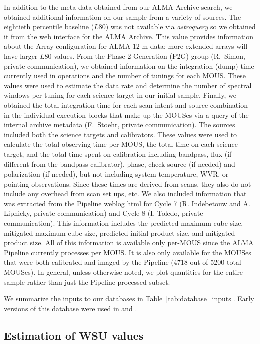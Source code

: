 \documentclass[preprint]{aastex631}
\begin{document}
In addition to the meta-data obtained from our ALMA Archive search, we obtained additional information on our sample from a variety of sources. The eightieth percentile baseline ($L80$) was not available via {\it astroquery} so we obtained it from the web interface for the ALMA Archive. This value provides information about the Array configuration for ALMA 12-m data: more extended arrays will have larger $L80$ values. From the Phase 2 Generation (P2G) group (R.\ Simon, private communication), we obtained information on the integration (dump) time currently used in operations and the number of tunings for each MOUS. These values were used to estimate the data rate and determine the number of spectral windows per tuning for each science target in our initial sample. Finally, we obtained the total integration time for each scan intent and source combination in the individual execution blocks that make up the MOUSes via a query of the internal archive metadata (F.\ Stoehr, private communication). The sources included both the science targets and calibrators. These values were used to calculate the total observing time per MOUS, the total time on each science target, and the total time spent on calibration including bandpass, flux (if different from the bandpass calibrator), phase,  check source (if needed) and polarization (if needed), but not including system temperature, WVR, or pointing observations. Since these times are derived from scans, they also do not include any overhead from scan set ups, etc. We also included information that was extracted from the Pipeline weblog html for Cycle 7 (R. Indebetouw and A. Lipnicky, private communication) and Cycle 8 (I. Toledo, private communication). This information includes the predicted maximum cube size, mitigated maximum cube size, predicted initial product size, and mitigated product size. All of this information is available only per-MOUS since the ALMA Pipeline currently processes per MOUS. It is also only available for the MOUSes that were both calibrated and imaged by the Pipeline (4718 out of 5200 total MOUSes). In general, unless otherwise noted, we plot quantities for the entire sample rather than just the Pipeline-processed subset.

We summarize the inputs to our databases in Table~\ref{tab:database_inputs}. Early versions of this database were used in \citet{Kepley2023Mitigation} and \citet{Kepley2023ImagingCubes}.

\subsection{Estimation of WSU values} \label{sec:wsu_estimates}
\end{document}
